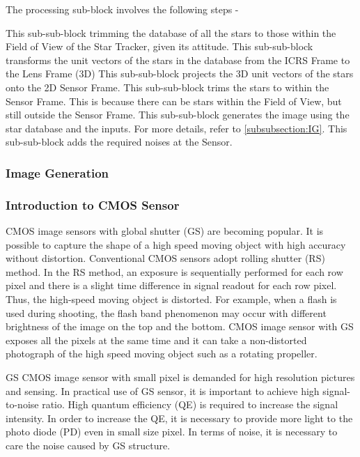 \documentclass[../../main.tex]{subfiles}
\begin{document}
The processing sub-block involves the following steps -
\begin{enumerate}[label={}]
     This sub-sub-block trimming the database of all the stars to those within the Field of View of the Star Tracker, given its attitude. 
     This sub-sub-block transforms the unit vectors of the stars in the database from the ICRS Frame to the Lens Frame (3D)
     This sub-sub-block projects the 3D unit vectors of the stars onto the 2D Sensor Frame. 
     This sub-sub-block trims the stars to within the Sensor Frame. This is because there can be stars within the Field of View, but still outside the Sensor Frame. 
     This sub-sub-block generates the image using the star database and the inputs. For more details, refer to \ref{subsubsection:IG}.
     This sub-sub-block adds the required noises at the Sensor.
\end{enumerate}


\subsubsection{Image Generation \label{subsubsection:IG}}
\blindtext


\newpage
\subsubsection{Introduction to CMOS Sensor}
CMOS image sensors with global shutter (GS) are becoming popular. It is possible to capture the shape of a high speed moving object with high accuracy without distortion. Conventional CMOS sensors adopt rolling shutter (RS) method. In the RS method, an exposure is sequentially performed for each row pixel and there is a slight time difference in signal readout for each row pixel. Thus, the high-speed moving object is distorted. For example, when a flash is used during shooting, the flash band phenomenon may occur with different brightness of the image on the top and the bottom. CMOS image sensor with GS exposes all the pixels at the same time and it can take a non-distorted photograph of the high speed moving object such as a rotating propeller. \cite{PLS} 

GS CMOS image sensor with small pixel is demanded for high resolution pictures and sensing. In practical use of GS sensor, it is important to achieve high signal-to-noise ratio. High quantum efficiency (QE) is required to increase the signal intensity. In order to increase the QE, it is necessary to provide more light to the photo diode (PD) even in small size pixel. In terms of noise, it is necessary to care the noise caused by GS structure.
\end{document}
